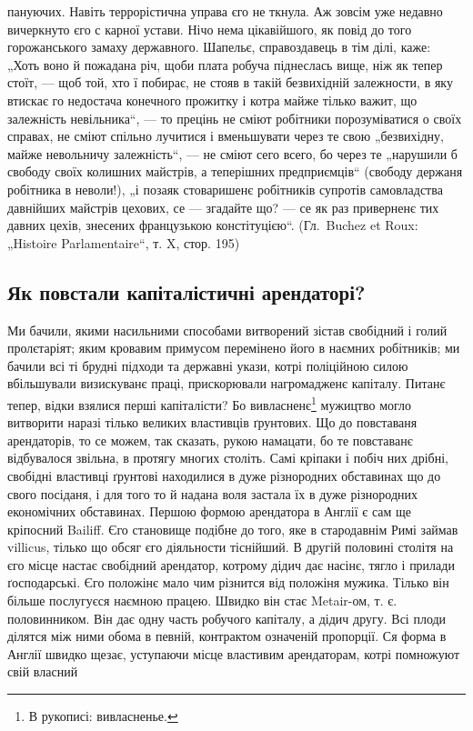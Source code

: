 \parcont{}
пануючих. Навіть террорістична управа єго не ткнула. Аж
зовсім уже недавно вичеркнуто єго с карної устави. Нічо
нема цікавійшого, як повід до того горожанського замаху
державного. Шапельє, справоздавець в тім ділі, каже: „Хоть
воно й пожадана річ, щоби плата робуча піднеслась вище,
ніж як тепер стоїт, — щоб той, хто ї побирає, не стояв
в такій безвихідній залежности, в яку втискає го недостача
конечного прожитку і котра майже тілько важит, що залежність
невільника“, — то прецінь не сміют робітники
порозуміватися о своїх справах, не сміют спільно лучитися
і вменьшувати через те свою „безвихідну, майже невольничу
залежність“, — не сміют сего всего, бо через те „нарушили б
свободу своїх колишних майстрів, а теперішних
предприємців“ (свободу держаня робітника в неволи!), „і позаяк
стоваришенє робітників супротів самовладства давнійших
майстрів цехових, се — згадайте що? — се як раз приверненє
тих давних цехів, знесених французькою констітуцією“.
(Гл.~Buchez et Roux: „Histoire Parlamentaire“, т. X,
стор. 195)

\subsection{Як повстали капіталістичні арендаторі?}

Ми бачили, якими насильними способами витворений
зістав свобідний і голий пролєтаріят; яким кровавим примусом
перемінено його в наємних робітників; ми бачили всі
ті брудні підходи та державні укази, котрі поліційною силою
вбільшували визискуванє праці, прискорювали нагромадженє
капіталу. Питанє тепер, відки взялися перші капіталісти?
Бо вивласненє\footnote*{
В рукописі: вивласненье.
} мужицтво
могло витворити наразі тілько великих властивців ґрунтових.
Що до повставаня арендаторів, то се можем, так сказать, рукою
намацати, бо те повставанє відбувалося звільна, в протягу
многих століть. Самі кріпаки і побіч них дрібні, свобідні
властивці ґрунтові находилися в дуже різнородних обставинах
що до свого посіданя, і для того то й надана воля
застала їх в дуже різнородних економічних обставинах.
Першою формою арендатора в Англії є сам ще кріпосний
Bailiff. Єго становище подібне до того, яке в стародавнім
Римі займав villicus, тілько що обсяг єго діяльности тіснійший.
В другій половині  столітя на єго місце настає свобідний
арендатор, котрому дідич дає насінє, тягло і прилади
ґосподарські. Єго положінє мало чим різнится від
положіня мужика. Тілько він більше послугуєся наємною
працею. Швидко він стає Metair-ом, т. є. половинником. Він
дає одну часть робучого капіталу, а дідич другу. Всі плоди
ділятся між ними обома в певній, контрактом означеній
пропорції. Ся форма в Англії швидко щезає, уступаючи
місце властивим арендаторам, котрі помножуют свій власний
\parbreak{}
